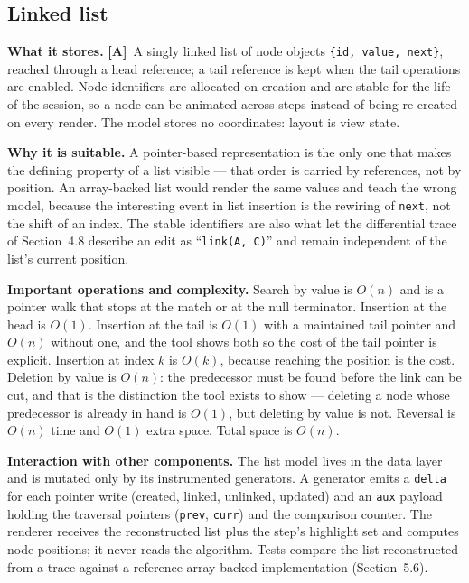 \documentclass[11pt,a4paper]{article}
\newcommand{\A}{\textcolor{asmc}{\textbf{[A]}}}     %
\newcommand{\ct}[1]{\texttt{#1}}
\begin{document}
\subsection{Linked list}

\noindent\textbf{What it stores.} \A\ A singly linked list of node objects
\ct{\{id, value, next\}}, reached through a head reference; a tail reference is kept when the tail
operations are enabled. Node identifiers are allocated on creation and are stable for the life of
the session, so a node can be animated across steps instead of being re-created on every render.
The model stores no coordinates: layout is view state.

\smallskip
\noindent\textbf{Why it is suitable.} A pointer-based representation is the only one that makes the
defining property of a list visible --- that order is carried by references, not by position. An
array-backed list would render the same values and teach the wrong model, because the interesting
event in list insertion is the rewiring of \ct{next}, not the shift of an index. The stable
identifiers are also what let the differential trace of Section~4.8 describe an edit as
``\ct{link(A, C)}'' and remain independent of the list's current position.

\smallskip
\noindent\textbf{Important operations and complexity.} Search by value is $O(n)$ and is a pointer
walk that stops at the match or at the null terminator. Insertion at the head is $O(1)$.
Insertion at the tail is $O(1)$ with a maintained tail pointer and $O(n)$ without one, and the
tool shows both so the cost of the tail pointer is explicit. Insertion at index $k$ is $O(k)$,
because reaching the position is the cost. Deletion by value is $O(n)$: the predecessor must be
found before the link can be cut, and that is the distinction the tool exists to show --- deleting
a node whose predecessor is already in hand is $O(1)$, but deleting by value is not. Reversal is
$O(n)$ time and $O(1)$ extra space. Total space is $O(n)$.

\smallskip
\noindent\textbf{Interaction with other components.} The list model lives in the data layer and is
mutated only by its instrumented generators. A generator emits a \ct{delta} for each pointer write
(created, linked, unlinked, updated) and an \ct{aux} payload holding the traversal pointers
(\ct{prev}, \ct{curr}) and the comparison counter. The renderer receives the reconstructed list
plus the step's highlight set and computes node positions; it never reads the algorithm. Tests
compare the list reconstructed from a trace against a reference array-backed implementation
(Section~5.6).
\end{document}
